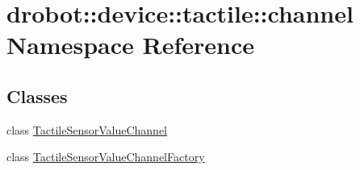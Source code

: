 \hypertarget{namespacedrobot_1_1device_1_1tactile_1_1channel}{\section{drobot\-:\-:device\-:\-:tactile\-:\-:channel Namespace Reference}
\label{namespacedrobot_1_1device_1_1tactile_1_1channel}
}
\subsection*{Classes}
\begin{DoxyCompactItemize}
\item 
class \hyperlink{classdrobot_1_1device_1_1tactile_1_1channel_1_1TactileSensorValueChannel}{Tactile\-Sensor\-Value\-Channel}
\item 
class \hyperlink{classdrobot_1_1device_1_1tactile_1_1channel_1_1TactileSensorValueChannelFactory}{Tactile\-Sensor\-Value\-Channel\-Factory}
\end{DoxyCompactItemize}
